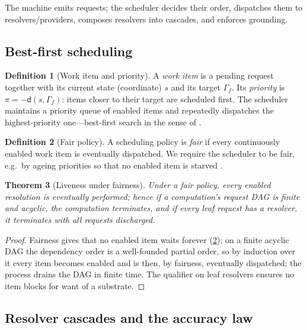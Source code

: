 \documentclass[11pt,a4paper]{article}
\theoremstyle{plain}
\newtheorem{theorem}{Theorem}[section]
\theoremstyle{definition}
\newtheorem{definition}[theorem]{Definition}
\theoremstyle{remark}
\newcommand{\dist}{\mathsf{d}}
\newcommand{\target}{\Gamma_{\!f}}
\begin{document}
The machine emits requests; the scheduler decides their order, dispatches them
to resolvers/providers, composes resolvers into cascades, and enforces grounding.

\subsection{Best-first scheduling}

\begin{definition}[Work item and priority]
\label{def:workitem}
A \emph{work item} is a pending request together with its current state
(coordinate) $s$ and its target $\target$. Its \emph{priority} is
$\pi=-\dist(s,\target)$: items closer to their target are scheduled first. The
scheduler maintains a priority queue of enabled items and repeatedly dispatches
the highest-priority one---best-first search in the sense of \citet{dijkstra1959,
hart1968}.
\end{definition}

\begin{definition}[Fair policy]
\label{def:fair}
A scheduling policy is \emph{fair} if every continuously enabled work item is
eventually dispatched. We require the scheduler to be fair, e.g.\ by ageing
priorities so that no enabled item is starved \citep{dijkstra1968}.
\end{definition}

\begin{theorem}[Liveness under fairness]
\label{thm:liveness}
Under a fair policy, every enabled resolution is eventually performed; hence if
a computation's request DAG is finite and acyclic, the computation terminates,
and if every leaf request has a resolver, it terminates with all requests
discharged.
\end{theorem}
\begin{proof}
Fairness gives that no enabled item waits forever (\cref{def:fair}); on a finite
acyclic DAG the dependency order is a well-founded partial order, so by
induction over it every item becomes enabled and is then, by fairness,
eventually dispatched; the process drains the DAG in finite time. The qualifier
on leaf resolvers ensures no item blocks for want of a substrate.
\end{proof}

\subsection{Resolver cascades and the accuracy law}
\end{document}

